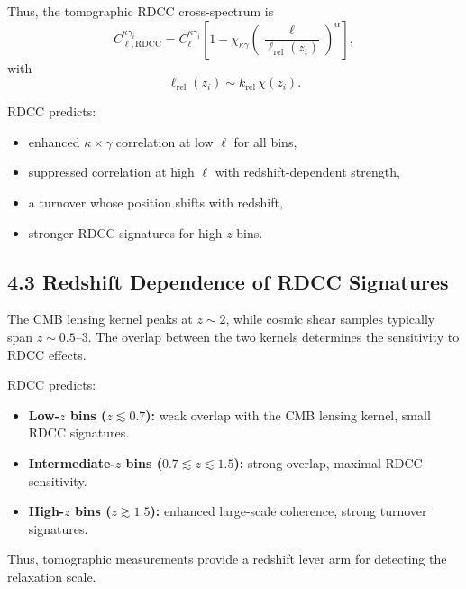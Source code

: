 \documentclass[11pt,a4paper]{article}
\begin{document}
Thus, the tomographic RDCC cross-spectrum is
\begin{equation}
    C_{\ell,\mathrm{RDCC}}^{\kappa\gamma_{i}}
    = C_{\ell}^{\kappa\gamma_{i}}
      \left[
        1 - \chi_{\kappa\gamma}
        \left(\frac{\ell}{\ell_{\mathrm{rel}}(z_{i})}\right)^{\alpha}
      \right],
\end{equation}
with
\begin{equation}
    \ell_{\mathrm{rel}}(z_{i})
    \sim k_{\mathrm{rel}}\,\chi(z_{i}).
\end{equation}

RDCC predicts:

\begin{itemize}
    \item enhanced $\kappa \times \gamma$ correlation at low $\ell$ for all bins,
    \item suppressed correlation at high $\ell$ with redshift-dependent strength,
    \item a turnover whose position shifts with redshift,
    \item stronger RDCC signatures for high-$z$ bins.
\end{itemize}

\subsection*{4.3 Redshift Dependence of RDCC Signatures}

The CMB lensing kernel peaks at $z \sim 2$, while cosmic shear samples typically span 
$z \sim 0.5$--$3$. The overlap between the two kernels determines the sensitivity to RDCC 
effects.

RDCC predicts:

\begin{itemize}
    \item \textbf{Low-$z$ bins ($z \lesssim 0.7$):}
    weak overlap with the CMB lensing kernel, small RDCC signatures.
    \item \textbf{Intermediate-$z$ bins ($0.7 \lesssim z \lesssim 1.5$):}
    strong overlap, maximal RDCC sensitivity.
    \item \textbf{High-$z$ bins ($z \gtrsim 1.5$):}
    enhanced large-scale coherence, strong turnover signatures.
\end{itemize}

Thus, tomographic measurements provide a redshift lever arm for detecting the relaxation 
scale.
\end{document}

